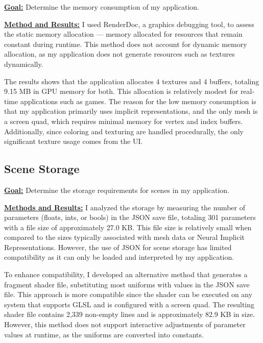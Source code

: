 \textbf{\underline{Goal:}}
Determine the memory consumption of my application.

\textbf{\underline{Method and Results:}}
I used RenderDoc, a graphics debugging tool, to assess the static memory allocation — memory allocated for resources that remain constant during runtime. This method does not account for dynamic memory allocation, as my application does not generate resources such as textures dynamically.

The results shows that the application allocates 4 textures and 4 buffers, totaling 9.15 MB in GPU memory for both. This allocation is relatively modest for real-time applications such as games. The reason for the low memory consumption is that my application primarily uses implicit representations, and the only mesh is a screen quad, which requires minimal memory for vertex and index buffers. Additionally, since coloring and texturing are handled procedurally, the only significant texture usage comes from the UI.


\subsection{Scene Storage}

\textbf{\underline{Goal:}}
Determine the storage requirements for scenes in my application.

\textbf{\underline{Methods and Results:}}
I analyzed the storage by measuring the number of parameters (floats, ints, or bools) in the JSON save file, totaling 301 parameters with a file size of approximately 27.0 KB. This file size is relatively small when compared to the sizes typically associated with mesh data or Neural Implicit Representations. However, the use of JSON for scene storage has limited compatibility as it can only be loaded and interpreted by my application.

To enhance compatibility, I developed an alternative method that generates a fragment shader file, substituting most uniforms with values in the JSON save file. This approach is more compatible since the shader can be executed on any system that supports GLSL and is configured with a screen quad. The resulting shader file contains 2,339 non-empty lines and is approximately 82.9 KB in size. However, this method does not support interactive adjustments of parameter values at runtime, as the uniforms are converted into constants.